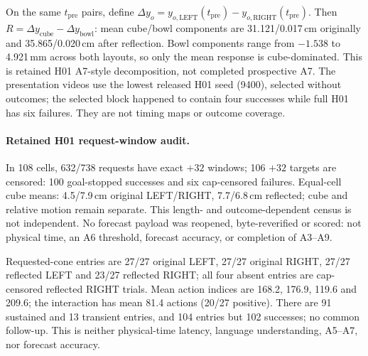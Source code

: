 \documentclass{article}
\begin{document}
On the same $t_{\mathrm{pre}}$ pairs, define $\Delta y_o=y_{o,\mathrm{LEFT}}(t_{\mathrm{pre}})-y_{o,\mathrm{RIGHT}}(t_{\mathrm{pre}})$. Then $R=\Delta y_{\mathrm{cube}}-\Delta y_{\mathrm{bowl}}$: mean cube/bowl components are 31.121/0.017\,cm originally and 35.865/0.020\,cm after reflection. Bowl components range from $-1.538$ to 4.921\,mm across both layouts, so only the mean response is cube-dominated. This is retained H01 A7-style decomposition, not completed prospective A7. The presentation videos use the lowest released H01 seed (9400), selected without outcomes; the selected block happened to contain four successes while full H01 has six failures. They are not timing maps or outcome coverage.

\paragraph{Retained H01 request-window audit.}
In 108 cells, 632/738 requests have exact $+32$ windows; 106 $+32$ targets are censored: 100 goal-stopped successes and six cap-censored failures. Equal-cell cube means: 4.5/7.9\,cm original LEFT/RIGHT, 7.7/6.8\,cm reflected; cube and relative motion remain separate. This length- and outcome-dependent census is not independent. No forecast payload was reopened, byte-reverified or scored: not physical time, an A6 threshold, forecast accuracy, or completion of A3--A9.

Requested-cone entries are 27/27 original LEFT, 27/27 original RIGHT, 27/27 reflected LEFT and 23/27 reflected RIGHT; all four absent entries are cap-censored reflected RIGHT trials. Mean action indices are 168.2, 176.9, 119.6 and 209.6; the interaction has mean 81.4 actions (20/27 positive). There are 91 sustained and 13 transient entries, and 104 entries but 102 successes; no common follow-up. This is neither physical-time latency, language understanding, A5--A7, nor forecast accuracy.
\end{document}
